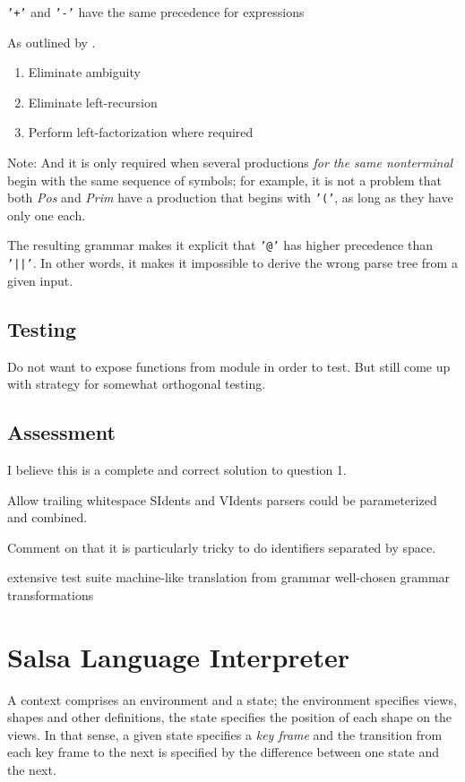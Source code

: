 \documentclass[
paper=a4,
oneside,
fontsize=11pt,
numbers=noenddot,
headinclude=false, %
footinclude=false, %
fleqn,             %
DIV=8
]{scrartcl}
\begin{document}
{\tt '+'} and {\tt '-'} have the same precedence for expressions

As outlined by \citet[p.~69]{mogensen2011}.

\begin{enumerate}
\item Eliminate ambiguity
\item Eliminate left-recursion
\item Perform left-factorization where required
\end{enumerate}

Note: And it is only required when several productions {\em for the same
  nonterminal} begin with the same sequence of symbols; for example, it is not a
problem that both {\em Pos} and {\em Prim} have a production that begins with
{\tt '('}, as long as they have only one each.

The resulting grammar makes it explicit that {\tt '@'} has higher precedence
than {\tt '||'}. In other words, it makes it impossible to derive the wrong
parse tree from a given input.

\subsection{Testing}
\label{sec:testing}

Do not want to expose functions from module in order to test. But still come up
with strategy for somewhat orthogonal testing.

\subsection{Assessment}
\label{sec:assessment}

I believe this is a complete and correct solution to question 1.

Allow trailing whitespace
SIdents and VIdents parsers could be parameterized and combined.

Comment on that it is particularly tricky to do identifiers separated by space.

extensive test suite
machine-like translation from grammar
well-chosen grammar transformations

\section{Salsa Language Interpreter}

A context comprises an environment and a state; the environment specifies views,
shapes and other definitions, the state specifies the position of each shape on
the views. In that sense, a given state specifies a {\em key frame} and the
transition from each key frame to the next is specified by the difference
between one state and the next.
\end{document}
